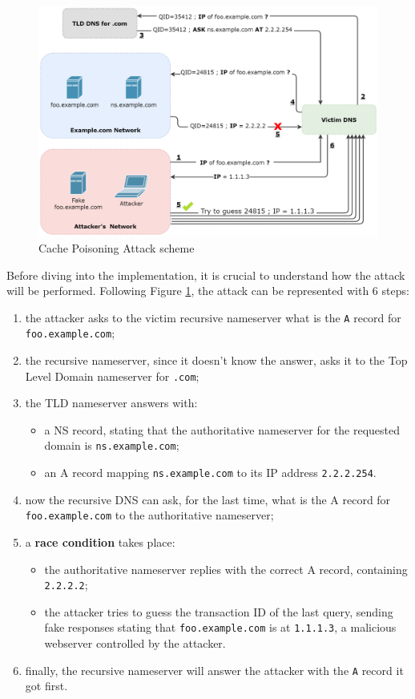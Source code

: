 \documentclass[11pt,a4paper]{article}
\begin{document}
\begin{figure}
    \centering
    \includegraphics[width=\textwidth]{cache-poisoning-attack.png}
    \caption{Cache Poisoning Attack scheme}
    \label{fig:cache-poisoning-attack}
\end{figure}

Before diving into the implementation, it is crucial to understand how the attack will be performed. Following Figure \ref{fig:cache-poisoning-attack}, the attack can be represented with 6 steps:
\begin{enumerate}
    \item the attacker asks to the victim recursive nameserver what is the \texttt{A} record for \texttt{foo.example.com};
    \item the recursive nameserver, since it doesn't know the answer, asks it to the Top Level Domain nameserver for \texttt{.com};
    \item the TLD nameserver answers with: 
    \begin{itemize}
        \item a NS record, stating that the authoritative nameserver for the requested domain is \texttt{ns.example.com};
        \item an A record mapping \texttt{ns.example.com} to its IP address \texttt{2.2.2.254}.
    \end{itemize}
    \item now the recursive DNS can ask, for the last time, what is the A record for \texttt{foo.example.com} to the authoritative nameserver;
    \item a \textbf{race condition} takes place:
    \begin{itemize}
        \item the authoritative nameserver replies with the correct A record, containing \texttt{2.2.2.2};
        \item the attacker tries to guess the transaction ID of the last query, sending fake responses stating that \texttt{foo.example.com} is at \texttt{1.1.1.3}, a malicious webserver controlled by the attacker.
    \end{itemize}
    \item finally, the recursive nameserver will answer the attacker with the \texttt{A} record it got first.
\end{enumerate}
\end{document}
